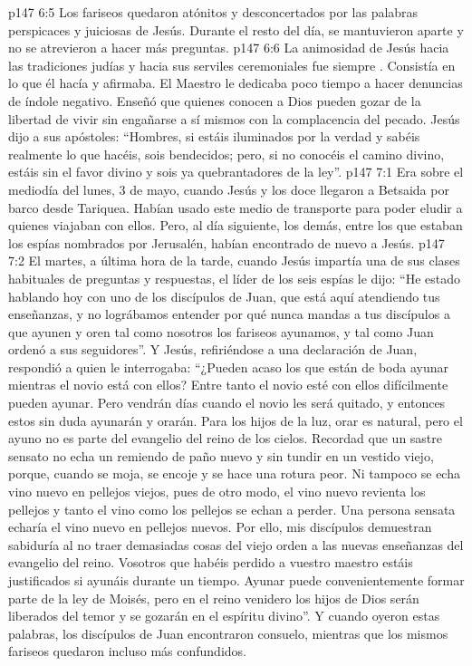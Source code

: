 \vs p147 6:5 Los fariseos quedaron atónitos y desconcertados por las palabras perspicaces y juiciosas de Jesús. Durante el resto del día, se mantuvieron aparte y no se atrevieron a hacer más preguntas.
\vs p147 6:6 \pc La animosidad de Jesús hacia las tradiciones judías y hacia sus serviles ceremoniales fue siempre . Consistía en lo que él hacía y afirmaba. El Maestro le dedicaba poco tiempo a hacer denuncias de índole negativo. Enseñó que quienes conocen a Dios pueden gozar de la libertad de vivir sin engañarse a sí mismos con la complacencia del pecado. Jesús dijo a sus apóstoles: “Hombres, si estáis iluminados por la verdad y sabéis realmente lo que hacéis, sois bendecidos; pero, si no conocéis el camino divino, estáis sin el favor divino y sois ya quebrantadores de la ley”.
\vs p147 7:1 Era sobre el mediodía del lunes, 3 de mayo, cuando Jesús y los doce llegaron a Betsaida por barco desde Tariquea. Habían usado este medio de transporte para poder eludir a quienes viajaban con ellos. Pero, al día siguiente, los demás, entre los que estaban los espías nombrados por Jerusalén, habían encontrado de nuevo a Jesús.
\vs p147 7:2 El martes, a última hora de la tarde, cuando Jesús impartía una de sus clases habituales de preguntas y respuestas, el líder de los seis espías le dijo: “He estado hablando hoy con uno de los discípulos de Juan, que está aquí atendiendo tus enseñanzas, y no lográbamos entender por qué nunca mandas a tus discípulos a que ayunen y oren tal como nosotros los fariseos ayunamos, y tal como Juan ordenó a sus seguidores”. Y Jesús, refiriéndose a una declaración de Juan, respondió a quien le interrogaba: “¿Pueden acaso los que están de boda ayunar mientras el novio está con ellos? Entre tanto el novio esté con ellos difícilmente pueden ayunar. Pero vendrán días cuando el novio les será quitado, y entonces estos sin duda ayunarán y orarán. Para los hijos de la luz, orar es natural, pero el ayuno no es parte del evangelio del reino de los cielos. Recordad que un sastre sensato no echa un remiendo de paño nuevo y sin tundir en un vestido viejo, porque, cuando se moja, se encoje y se hace una rotura peor. Ni tampoco se echa vino nuevo en pellejos viejos, pues de otro modo, el vino nuevo revienta los pellejos y tanto el vino como los pellejos se echan a perder. Una persona sensata echaría el vino nuevo en pellejos nuevos. Por ello, mis discípulos demuestran sabiduría al no traer demasiadas cosas del viejo orden a las nuevas enseñanzas del evangelio del reino. Vosotros que habéis perdido a vuestro maestro estáis justificados si ayunáis durante un tiempo. Ayunar puede convenientemente formar parte de la ley de Moisés, pero en el reino venidero los hijos de Dios serán liberados del temor y se gozarán en el espíritu divino”. Y cuando oyeron estas palabras, los discípulos de Juan encontraron consuelo, mientras que los mismos fariseos quedaron incluso más confundidos.
